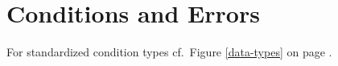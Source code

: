 %
%

\section{Conditions and Errors} 

For standardized condition types cf.\ Figure \ref{data-types} on
page \pageref{data-types}.

